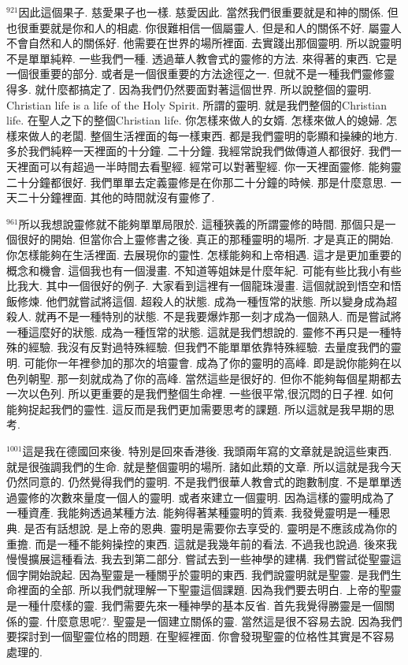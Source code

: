\documentclass{book}
\begin{document}
$^{921}$因此這個果子.
慈愛果子也一樣.
慈愛因此.
當然我們很重要就是和神的關係.
但也很重要就是你和人的相處.
你很難相信一個屬靈人.
但是和人的關係不好.
屬靈人不會自然和人的關係好.
他需要在世界的場所裡面.
去實踐出那個靈明.
所以說靈明不是單單純粹.
一些我們一種.
透過華人教會式的靈修的方法.
來得著的東西.
它是一個很重要的部分.
或者是一個很重要的方法途徑之一.
但就不是一種我們靈修靈得多.
就什麼都搞定了.
因為我們仍然要面對著這個世界.
所以說整個的靈明.
Christian life is a life of the Holy Spirit.
所謂的靈明.
就是我們整個的Christian life.
在聖人之下的整個Christian life.
你怎樣來做人的女婿.
怎樣來做人的媳婦.
怎樣來做人的老闆.
整個生活裡面的每一樣東西.
都是我們靈明的彰顯和操練的地方.
多於我們純粹一天裡面的十分鐘.
二十分鐘.
我經常說我們做傳道人都很好.
我們一天裡面可以有超過一半時間去看聖經.
經常可以對著聖經.
你一天裡面靈修.
能夠靈二十分鐘都很好.
我們單單去定義靈修是在你那二十分鐘的時候.
那是什麼意思.
一天二十分鐘裡面.
其他的時間就沒有靈修了.

$^{961}$所以我想說靈修就不能夠單單局限於.
這種狹義的所謂靈修的時間.
那個只是一個很好的開始.
但當你合上靈修書之後.
真正的那種靈明的場所.
才是真正的開始.
你怎樣能夠在生活裡面.
去展現你的靈性.
怎樣能夠和上帝相遇.
這才是更加重要的概念和機會.
這個我也有一個漫畫.
不知道等姐妹是什麼年紀.
可能有些比我小有些比我大.
其中一個很好的例子.
大家看到這裡有一個龍珠漫畫.
這個就說到悟空和悟飯修煉.
他們就嘗試將這個.
超殺人的狀態.
成為一種恆常的狀態.
所以變身成為超殺人.
就再不是一種特別的狀態.
不是我要爆炸那一刻才成為一個熟人.
而是嘗試將一種這麼好的狀態.
成為一種恆常的狀態.
這就是我們想說的.
靈修不再只是一種特殊的經驗.
我沒有反對過特殊經驗.
但我們不能單單依靠特殊經驗.
去量度我們的靈明.
可能你一年裡參加的那次的培靈會.
成為了你的靈明的高峰.
即是說你能夠在以色列朝聖.
那一刻就成為了你的高峰.
當然這些是很好的.
但你不能夠每個星期都去一次以色列.
所以更重要的是我們整個生命裡.
一些很平常,很沉悶的日子裡.
如何能夠捉起我們的靈性.
這反而是我們更加需要思考的課題.
所以這就是我早期的思考.

$^{1001}$這是我在德國回來後.
特別是回來香港後.
我頭兩年寫的文章就是說這些東西.
就是很強調我們的生命.
就是整個靈明的場所.
諸如此類的文章.
所以這就是我今天仍然同意的.
仍然覺得我們的靈明.
不是我們很華人教會式的跑數制度.
不是單單透過靈修的次數來量度一個人的靈明.
或者來建立一個靈明.
因為這樣的靈明成為了一種資產.
我能夠透過某種方法.
能夠得著某種靈明的質素.
我發覺靈明是一種恩典.
是否有話想說.
是上帝的恩典.
靈明是需要你去享受的.
靈明是不應該成為你的重擔.
而是一種不能夠操控的東西.
這就是我幾年前的看法.
不過我也說過.
後來我慢慢擴展這種看法.
我去到第二部分.
嘗試去到一些神學的建構.
我們嘗試從聖靈這個字開始說起.
因為聖靈是一種關乎於靈明的東西.
我們說靈明就是聖靈.
是我們生命裡面的全部.
所以我們就理解一下聖靈這個課題.
因為我們要去明白.
上帝的聖靈是一種什麼樣的靈.
我們需要先來一種神學的基本反省.
首先我覺得勝靈是一個關係的靈.
什麼意思呢?.
聖靈是一個建立關係的靈.
當然這是很不容易去說.
因為我們要探討到一個聖靈位格的問題.
在聖經裡面.
你會發現聖靈的位格性其實是不容易處理的.
\end{document}

